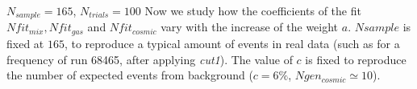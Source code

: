 \documentclass[9pt]{beamer}
\newcommand{\nologo}{\setbeamertemplate{logo}{}}
\begin{document}
{\nologo
\begin{frame}{$N_{sample} = 165$, $N_{trials} = 100$}
Now we study how the coefficients of the fit $Nfit_{mix}, Nfit_{gas}$ and $Nfit_{cosmic}$ vary with the increase of the weight $a$. $Nsample$ is fixed at $165$, to reproduce a typical amount of events in real data (such as for a frequency of run 68465, after applying \textit{cut1}). The value of $c$ is fixed to reproduce the number of expected events from background ($c = 6\%$, $Ngen_{cosmic} \simeq 10$).
\begin{figure}
\end{figure}
\end{frame}
}
\end{document}
